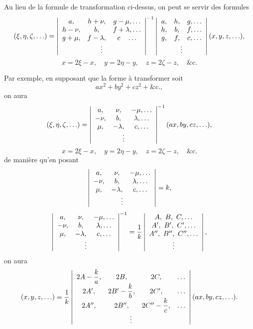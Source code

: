 \documentclass[11pt,a4paper]{article}
\begin{document}
\medskip

Au lieu de la formule de transformation ci-dessus, on peut se servir des formules
\[
(\xi,\eta,\zeta,\ldots) = \left\lvert\begin{array}{cccc}
a, & h+\nu, & g-\mu,\ldots\\
h-\nu, & b, & f+\lambda,\ldots\\
g+\mu, & f-\lambda, & c\quad\ldots\\
\multicolumn{3}{c}{\vdots}
\end{array}\right\rvert^{-1}
\left\lvert\begin{array}{cccc}
a, & h, & g,\ldots\\
h, & b, & f,\ldots\\
g, & f, & c,\ldots\\
\multicolumn{3}{c}{\vdots}
\end{array}\right\rvert (x,y,z,\ldots),
\]
\[
x = 2\xi - x,\quad y = 2\eta - y,\quad z = 2\zeta - z,\quad\&\mathrm{c}.
\]

\medskip

Par exemple, en supposant que la forme \`a transformer soit
\[
ax^2 + by^2 + cz^2 + \&\mathrm{c}.,
\]
on aura
\[
(\xi,\eta,\zeta,\ldots) = \left\lvert\begin{array}{cccc}
a, & \nu, & -\mu,\ldots\\
-\nu, & b, & \lambda,\ldots\\
\mu, & -\lambda, & c,\ldots\\
\multicolumn{3}{c}{\vdots}
\end{array}\right\rvert^{-1} (ax,by,cz,\ldots),
\]
\[
x = 2\xi - x,\quad y = 2\eta - y,\quad z = 2\zeta - z,\quad\&\mathrm{c}.
\]
de mani\`ere qu'en posant
\[
\left\lvert\begin{array}{cccc}
a, & \nu, & -\mu,\ldots\\
-\nu, & b, & \lambda,\ldots\\
\mu, & -\lambda, & c,\ldots\\
\multicolumn{3}{c}{\vdots}
\end{array}\right\rvert = k,
\]
\[
\left\lvert\begin{array}{cccc}
a, & \nu, & -\mu,\ldots\\
-\nu, & b, & \lambda,\ldots\\
\mu, & -\lambda, & c,\ldots\\
\multicolumn{3}{c}{\vdots}
\end{array}\right\rvert^{-1} = \frac{1}{k}\left\lvert\begin{array}{ccc}
A,\ B,\ C,\ldots\\
A',\ B',\ C',\ldots\\
A'',\ B'',\ C'',\ldots\\
\vdots
\end{array}\right\rvert ,
\]
on aura
\[
(x,y,z,\ldots) = \frac{1}{k}\left\lvert\begin{array}{cccc}
2A - \dfrac{k}{a}, & 2B, & 2C, &\ldots\\[1mm]
2A', & 2B' - \dfrac{k}{b}, & 2C', &\ldots\\[1mm]
2A'', & 2B'', & 2C'' - \dfrac{k}{c}, &\ldots\\
\multicolumn{4}{c}{\vdots}
\end{array}\right\rvert (ax,by,cz,\ldots).
\]
\end{document}
